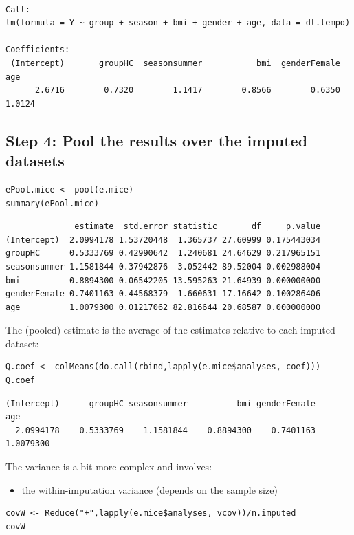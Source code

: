 \documentclass[12pt]{article}
\begin{document}
\begin{verbatim}

Call:
lm(formula = Y ~ group + season + bmi + gender + age, data = dt.tempo)

Coefficients:
 (Intercept)       groupHC  seasonsummer           bmi  genderFemale           age  
      2.6716        0.7320        1.1417        0.8566        0.6350        1.0124
\end{verbatim}

\clearpage

\subsection{Step 4: Pool the results over the imputed datasets}
\label{sec:org16ce1fb}

\lstset{language=r,label= ,caption= ,captionpos=b,numbers=none}
\begin{lstlisting}
ePool.mice <- pool(e.mice)
summary(ePool.mice)
\end{lstlisting}

\begin{verbatim}
              estimate  std.error statistic       df     p.value
(Intercept)  2.0994178 1.53720448  1.365737 27.60999 0.175443034
groupHC      0.5333769 0.42990642  1.240681 24.64629 0.217965151
seasonsummer 1.1581844 0.37942876  3.052442 89.52004 0.002988004
bmi          0.8894300 0.06542205 13.595263 21.64939 0.000000000
genderFemale 0.7401163 0.44568379  1.660631 17.16642 0.100286406
age          1.0079300 0.01217062 82.816644 20.68587 0.000000000
\end{verbatim}


The (pooled) estimate is the average of the estimates relative to each
imputed dataset:
\lstset{language=r,label= ,caption= ,captionpos=b,numbers=none}
\begin{lstlisting}
Q.coef <- colMeans(do.call(rbind,lapply(e.mice$analyses, coef)))
Q.coef
\end{lstlisting}

\begin{verbatim}
(Intercept)      groupHC seasonsummer          bmi genderFemale          age 
  2.0994178    0.5333769    1.1581844    0.8894300    0.7401163    1.0079300
\end{verbatim}

The variance is a bit more complex and involves:
\begin{itemize}
\item the within-imputation variance (depends on the sample size)
\end{itemize}
\lstset{language=r,label= ,caption= ,captionpos=b,numbers=none}
\begin{lstlisting}
covW <- Reduce("+",lapply(e.mice$analyses, vcov))/n.imputed
covW
\end{lstlisting}
\end{document}

